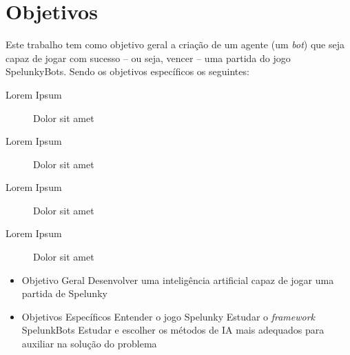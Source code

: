 \chapter{\label{chap:objectives}Objetivos}
Este trabalho tem como objetivo geral a criação de um agente (um \textit{bot})
que seja capaz de jogar com sucesso -- ou seja, vencer -- uma partida do jogo
SpelunkyBots. Sendo os objetivos específicos os seguintes:

\begin{description}
    \item [Lorem Ipsum]
        Dolor sit amet
    \item [Lorem Ipsum]
        Dolor sit amet
    \item [Lorem Ipsum]
        Dolor sit amet
    \item [Lorem Ipsum]
        Dolor sit amet
\end{description}

\begin{itemize}
    \item Objetivo Geral
        \subitem Desenvolver uma inteligência artificial capaz de jogar uma partida de Spelunky
    \item Objetivos Específicos
        \subitem Entender o jogo Spelunky
        \subitem Estudar o \textit{framework} SpelunkBots
        \subitem Estudar e escolher os métodos de IA mais adequados para auxiliar na solução do problema
\end{itemize}

